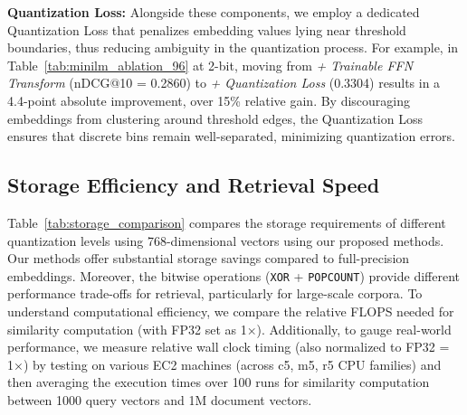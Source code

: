 \noindent
\textbf{Quantization Loss:}
Alongside these components, we employ a dedicated Quantization Loss that penalizes embedding values lying near threshold boundaries, thus reducing ambiguity in the quantization process. For example, in Table~\ref{tab:minilm_ablation_96} at 2-bit, moving from \textit{+ Trainable FFN Transform} (nDCG@10 = 0.2860) to \textit{+ Quantization Loss} (0.3304) results in a 4.4-point absolute improvement, over 15\% relative gain. 
By discouraging embeddings from clustering around threshold edges, the Quantization Loss ensures that discrete bins remain well-separated, minimizing quantization errors. 

\subsection{Storage Efficiency and Retrieval Speed}

Table~\ref{tab:storage_comparison} compares the storage requirements of different quantization levels using 768-dimensional vectors using our proposed methods. 
Our methods offer substantial storage savings compared to full-precision embeddings. 
Moreover, the bitwise operations (\texttt{XOR} + \texttt{POPCOUNT}) provide different performance trade-offs for retrieval, particularly for large-scale corpora. 
To understand computational efficiency, we compare the relative FLOPS needed for similarity computation (with FP32 set as 1×). 
Additionally, to gauge real-world performance, we measure relative wall clock timing (also normalized to FP32 = 1×) by testing on various EC2 machines (across c5, m5, r5 CPU families) and then averaging the execution times over 100 runs for similarity computation between 1000 query vectors and 1M document vectors.


